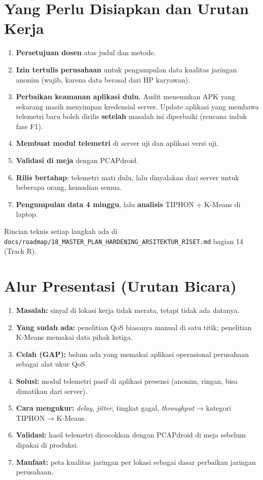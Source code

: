 \documentclass[11pt,a4paper]{article}
\begin{document}
\section{Yang Perlu Disiapkan dan Urutan Kerja}
\begin{enumerate}
\item \textbf{Persetujuan dosen} atas judul dan metode.
\item \textbf{Izin tertulis perusahaan} untuk pengumpulan data kualitas jaringan anonim (wajib, karena data berasal dari HP karyawan).
\item \textbf{Perbaikan keamanan aplikasi dulu.} Audit menemukan APK yang sekarang masih menyimpan kredensial server. Update aplikasi yang membawa telemetri baru boleh dirilis \textbf{setelah} masalah ini diperbaiki (rencana induk fase F1).
\item \textbf{Membuat modul telemetri} di server uji dan aplikasi versi uji.
\item \textbf{Validasi di meja} dengan PCAPdroid.
\item \textbf{Rilis bertahap}: telemetri mati dulu, lalu dinyalakan dari server untuk beberapa orang, kemudian semua.
\item \textbf{Pengumpulan data 4 minggu}, lalu \textbf{analisis} TIPHON + K-Means di laptop.
\end{enumerate}
Rincian teknis setiap langkah ada di \texttt{docs/roadmap/18\_MASTER\_PLAN\_HARDENING\_ARSITEKTUR\_RISET.md} bagian 14 (Track R).

\section{Alur Presentasi (Urutan Bicara)}
\begin{enumerate}
\item \textbf{Masalah:} sinyal di lokasi kerja tidak merata, tetapi tidak ada datanya.
\item \textbf{Yang sudah ada:} penelitian QoS biasanya manual di satu titik; penelitian K-Means memakai data pihak ketiga.
\item \textbf{Celah (GAP):} belum ada yang memakai aplikasi operasional perusahaan sebagai alat ukur QoS.
\item \textbf{Solusi:} modul telemetri pasif di aplikasi presensi (anonim, ringan, bisa dimatikan dari server).
\item \textbf{Cara mengukur:} \textit{delay}, \textit{jitter}, tingkat gagal, \textit{throughput} → kategori TIPHON → K-Means.
\item \textbf{Validasi:} hasil telemetri dicocokkan dengan PCAPdroid di meja sebelum dipakai di produksi.
\item \textbf{Manfaat:} peta kualitas jaringan per lokasi sebagai dasar perbaikan jaringan perusahaan.
\end{enumerate}
\end{document}
